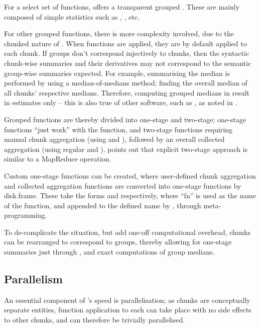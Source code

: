 For a select set of functions,  offers a transparent grouped .
These are mainly composed of simple statistics such as , , etc.

For other grouped functions, there is more complexity involved, due to the chunked nature of .
When functions are applied, they are by default applied to each chunk.
If groups don't correspond injectively to chunks, then the syntactic chunk-wise summaries and their derivatives may not correspond to the semantic group-wise summaries expected.
For example, summarising the median is performed by using a median-of-medians method; finding the overall median of all chunks' respective medians.
Therefore, computing grouped medians in  result in estimates only -- this is also true of other software, such as , as noted in \cite{zj19:_group_by}.

Grouped functions are thereby divided into one-stage and two-stage; one-stage functions ``just work'' with the  function, and two-stage functions requiring manual chunk aggregation (using  and ), followed by an overall collected aggregation (using regular  and ).
\Textcite{zj19:_group_by}
points out that explicit two-stage approach is similar to a MapReduce
operation.

Custom one-stage functions can be created, where user-defined chunk aggregation and collected aggregation functions are converted into one-stage functions by disk.frame\cite{zj19:_custom_one_stage_group_by_funct}.
These take the forms  and  respectively, where ``fn'' is used as the name of the function, and appended to the defined name by , through meta-programming.

To de-complicate the situation, but add one-off computational overhead, chunks can be rearranged to correspond to groups, thereby allowing for one-stage summaries just through , and exact computations of group medians.

\subsection{Parallelism}\label{sec:parallelisation}

An essential component of 's speed is parallelisation; as chunks are conceptually separate entities, function application to each can take place with no side effects to other chunks, and can therefore be trivially parallelised.

